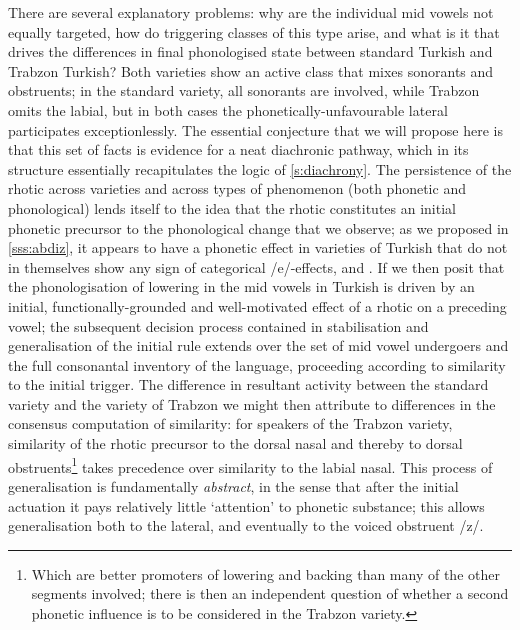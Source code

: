 There are several explanatory problems: why are the individual mid vowels not equally targeted, how do triggering classes of this type arise, and what is it that drives the differences in final phonologised state between standard Turkish and Trabzon Turkish? Both varieties show an active class that mixes sonorants and obstruents; in the standard variety, all sonorants are involved, while Trabzon omits the labial, but in both cases the phonetically-unfavourable lateral participates exceptionlessly. The essential conjecture that we will propose here is that this set of facts is evidence for a neat diachronic pathway, which in its structure essentially recapitulates the logic of \cref{s:diachrony}. The persistence of the rhotic across varieties and across types of phenomenon (both phonetic and phonological) lends itself to the idea that the rhotic constitutes an initial phonetic precursor to the phonological change that we observe; as we proposed in \cref{sss:abdiz}, it appears to have a phonetic effect in varieties of Turkish that do not in themselves show any sign of categorical /e/-effects, and . If we then posit that the phonologisation of lowering in the mid vowels in Turkish is driven by an initial, functionally-grounded and well-motivated effect of a rhotic on a preceding vowel; the subsequent decision process contained in stabilisation and generalisation of the initial rule extends over the set of mid vowel undergoers and the full consonantal inventory of the language, proceeding according to similarity to the initial trigger. The difference in resultant activity between the standard variety and the variety of Trabzon we might then attribute to differences in the consensus computation of similarity: for speakers of the Trabzon variety, similarity of the rhotic precursor to the dorsal nasal and thereby to dorsal obstruents\footnote{Which are better promoters of lowering and backing than many of the other segments involved; there is then an independent question of whether a second phonetic influence is to be considered in the Trabzon variety.} takes precedence over similarity to the labial nasal. This process of generalisation is fundamentally \emph{abstract}, in the sense that after the initial actuation it pays relatively little `attention' to phonetic substance; this allows generalisation both to the lateral, and eventually to the voiced obstruent /z/.

%

